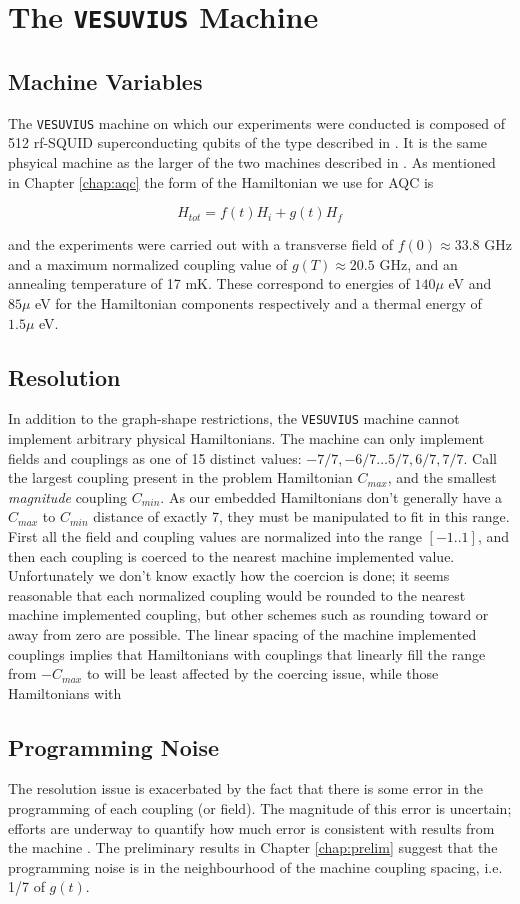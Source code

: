 \chapter{The \texttt{VESUVIUS} Machine}

\section{Machine Variables}
The \texttt{VESUVIUS} machine on which our experiments were conducted is composed of 512 rf-SQUID superconducting qubits of the type described in \cite{qubit} \cite{dwave_nature}. It is the same phsyical machine as the larger of the two machines described in \cite{pudenz}.
As mentioned in Chapter \ref{chap:aqc} the form of the Hamiltonian we use for AQC is

\begin{displaymath}
	H_{tot} = f(t)H_i + g(t)H_f
\end{displaymath}

and the experiments were carried out with a transverse field of $f(0) \approx 33.8 $ GHz and a maximum normalized coupling value of $g(T) \approx 20.5$ GHz, and an annealing temperature of 17 mK.  These correspond to energies of $140 \mu$ eV and $85 \mu$ eV for the Hamiltonian components respectively and a thermal energy of $1.5 \mu$ eV.

\section{Resolution}
In addition to the graph-shape restrictions, the \texttt{VESUVIUS} machine cannot implement arbitrary physical Hamiltonians.  The machine can only implement fields and couplings as one of 15 distinct values: $-7/7, -6/7 \dots 5/7,6/7, 7/7$.  Call the largest coupling present in the problem Hamiltonian $C_{max}$, and the smallest \emph{magnitude} coupling $C_{min}$.  As our embedded Hamiltonians don't generally have a $C_{max}$ to $C_{min}$ distance of exactly 7, they must be manipulated to fit in this range.
First  all the field and coupling values are normalized into the range $[-1..1]$, and then each coupling is coerced to the nearest machine implemented value.
Unfortunately we don't know exactly how the coercion is done; it seems reasonable that each normalized coupling would be rounded to the nearest machine implemented coupling, but other schemes such as rounding toward or away from zero are possible.
The linear spacing of the machine implemented couplings implies that Hamiltonians with couplings that linearly fill the range from $-C_{max}$ to  will be least affected by the coercing issue, while those Hamiltonians with 

\section{Programming Noise}
The resolution issue is exacerbated by the fact that there is some error in the programming of each coupling (or field).  The magnitude of this error is uncertain; efforts are underway to quantify how much error is consistent with results from the machine \cite{aaron}.
The preliminary results in Chapter \ref{chap:prelim} suggest that the programming noise is in the neighbourhood of the machine coupling spacing, i.e. 1/7 of $g(t)$.
